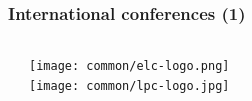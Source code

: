 \begin{frame}
  \frametitle{International conferences (1)}
  \begin{columns}
    \begin{itemize}
    
    
    \end{itemize}
    \begin{center}
      \texttt{[image: common/elc-logo.png]}\\
      \vspace{1cm}
      \texttt{[image: common/lpc-logo.jpg]}\\
    \end{center}
  \end{columns}
\end{frame}

